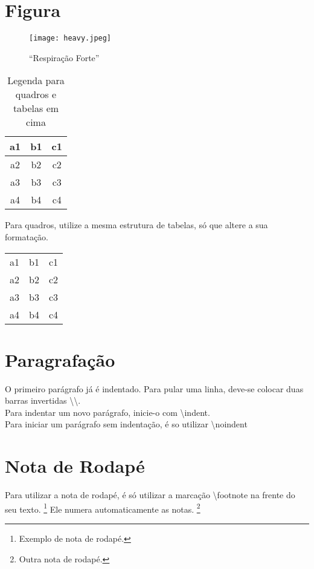 \documentclass[12pt,openright,oneside,a4paper,english,french,spanish,brazil]{unifil}
\begin{document}
\section{Figura}

\begin{figure}[htb]
	\centering
	\texttt{[image: heavy.jpeg]} %
	\caption{``Respiração Forte''} 	
\end{figure}

\begin{table}[htb]
\caption{Legenda para quadros e tabelas em cima}
\begin{tabular}{|c|c|c|}
\hline
a1 & b1 & c1 \\ \hline
a2 & b2 & c2 \\ \hline
a3 & b3 & c3 \\ \hline
a4 & b4 & c4 \\ \hline
\end{tabular}
\end{table}

Para quadros, utilize a mesma estrutura de tabelas, só que altere a sua formatação.
\begin{quadro}[htb]
\caption{\label{quadro_modelo}Legenda do quadro}
\begin{tabular}{ c c c }
a1 & b1 & c1 \\ 
a2 & b2 & c2 \\ 
a3 & b3 & c3 \\ 
a4 & b4 & c4 \\ 
\end{tabular}
\end{quadro}

\section{Paragrafação}
O primeiro parágrafo já é indentado. Para pular uma linha, deve-se colocar duas barras invertidas \textbackslash \textbackslash. \\
\indent Para indentar um novo parágrafo, inicie-o com \textbackslash indent.\\
\noindent Para iniciar um parágrafo sem indentação, é so utilizar \textbackslash noindent

\section{Nota de Rodapé}
Para utilizar a nota de rodapé, é só utilizar a marcação \textbackslash footnote na frente do seu texto. \footnote{Exemplo de nota de rodapé.} Ele numera automaticamente as notas. \footnote{Outra nota de rodapé.}
\end{document}
